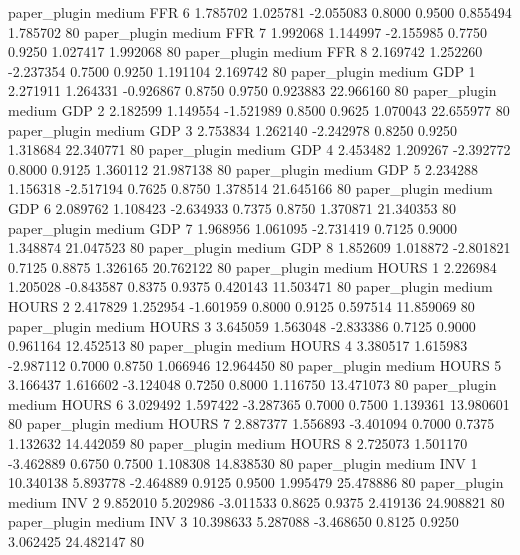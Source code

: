   paper_plugin     medium      FFR                 6  1.785702 1.025781 -2.055083 0.8000 0.9500  0.855494    1.785702 80
  paper_plugin     medium      FFR                 7  1.992068 1.144997 -2.155985 0.7750 0.9250  1.027417    1.992068 80
  paper_plugin     medium      FFR                 8  2.169742 1.252260 -2.237354 0.7500 0.9250  1.191104    2.169742 80
  paper_plugin     medium      GDP                 1  2.271911 1.264331 -0.926867 0.8750 0.9750  0.923883   22.966160 80
  paper_plugin     medium      GDP                 2  2.182599 1.149554 -1.521989 0.8500 0.9625  1.070043   22.655977 80
  paper_plugin     medium      GDP                 3  2.753834 1.262140 -2.242978 0.8250 0.9250  1.318684   22.340771 80
  paper_plugin     medium      GDP                 4  2.453482 1.209267 -2.392772 0.8000 0.9125  1.360112   21.987138 80
  paper_plugin     medium      GDP                 5  2.234288 1.156318 -2.517194 0.7625 0.8750  1.378514   21.645166 80
  paper_plugin     medium      GDP                 6  2.089762 1.108423 -2.634933 0.7375 0.8750  1.370871   21.340353 80
  paper_plugin     medium      GDP                 7  1.968956 1.061095 -2.731419 0.7125 0.9000  1.348874   21.047523 80
  paper_plugin     medium      GDP                 8  1.852609 1.018872 -2.801821 0.7125 0.8875  1.326165   20.762122 80
  paper_plugin     medium    HOURS                 1  2.226984 1.205028 -0.843587 0.8375 0.9375  0.420143   11.503471 80
  paper_plugin     medium    HOURS                 2  2.417829 1.252954 -1.601959 0.8000 0.9125  0.597514   11.859069 80
  paper_plugin     medium    HOURS                 3  3.645059 1.563048 -2.833386 0.7125 0.9000  0.961164   12.452513 80
  paper_plugin     medium    HOURS                 4  3.380517 1.615983 -2.987112 0.7000 0.8750  1.066946   12.964450 80
  paper_plugin     medium    HOURS                 5  3.166437 1.616602 -3.124048 0.7250 0.8000  1.116750   13.471073 80
  paper_plugin     medium    HOURS                 6  3.029492 1.597422 -3.287365 0.7000 0.7500  1.139361   13.980601 80
  paper_plugin     medium    HOURS                 7  2.887377 1.556893 -3.401094 0.7000 0.7375  1.132632   14.442059 80
  paper_plugin     medium    HOURS                 8  2.725073 1.501170 -3.462889 0.6750 0.7500  1.108308   14.838530 80
  paper_plugin     medium      INV                 1 10.340138 5.893778 -2.464889 0.9125 0.9500  1.995479   25.478886 80
  paper_plugin     medium      INV                 2  9.852010 5.202986 -3.011533 0.8625 0.9375  2.419136   24.908821 80
  paper_plugin     medium      INV                 3 10.398633 5.287088 -3.468650 0.8125 0.9250  3.062425   24.482147 80

